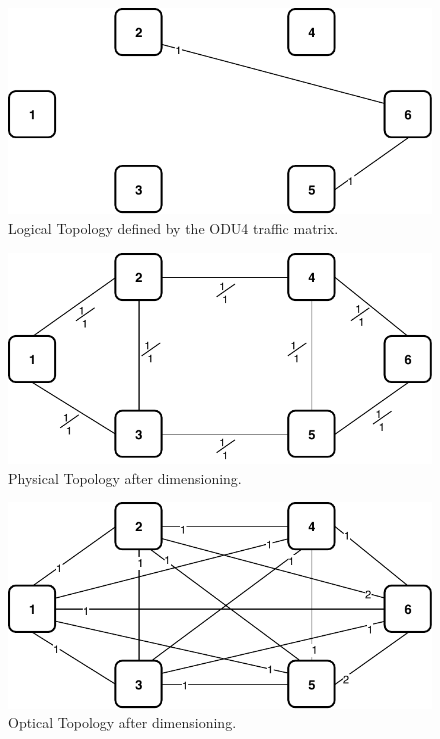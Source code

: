 \begin{figure}[h!]
\centering
\includegraphics[width=12cm]{sdf/ilp/transparent_survivability/figures/logical_topology_ODU4_low}
\caption{Logical Topology defined by the ODU4 traffic matrix.}
\label{logical2_ODU4_low}
\end{figure}

\begin{figure}[h!]
\centering
\includegraphics[width=12cm]{sdf/ilp/transparent_survivability/figures/physical_topology}
\caption{Physical Topology after dimensioning.}
\label{physical2_low}
\end{figure}

\begin{figure}[h!]
\centering
\includegraphics[width=12cm]{sdf/ilp/transparent_survivability/figures/optical_topology_low}
\caption{Optical Topology after dimensioning.}
\label{optical2_low}
\end{figure}

